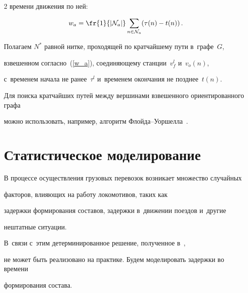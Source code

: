 \begin{multicols}{2}
времени движения по ней:


\begin{equation}


    \label{w_a}


    w_a = \fr {1}{|\mathcal N_a|}\sum\limits_{n\in \mathcal N_a} (\tau(n) - t(n))\,.


\end{equation}





Полагаем $N^*$ равной нитке, проходящей по кратчайшему пути в~графе~$G$, 


взвешенном согласно~(\ref{w_a}), соединяющему станции~$v^l_f$ и~$v_o(n)$, 


с~временем начала не ранее~$\tau^l$ и~временем окончания не позднее~$t(n)$. 


Для поиска кратчайших путей между вершинами взвешенного ориентированного графа 


можно использовать, например, алгоритм Флой\-да--Уор\-шел\-ла~\cite{Floyd}.





\vspace*{-6pt}





\section{Статистическое моделирование}





\vspace*{-2pt}





В процессе осуществления грузовых перевозок возникает множество случайных 


факторов, влияющих на работу локомотивов, таких как


задержки формирования составов, задержки в~движении поездов и~другие 


нештатные ситуации. 


В~связи с~этим детерминированное решение, полученное в~\cite{AzanovBuyanov}, 


не может быть реализовано на практике. Будем моделировать задержки во времени 


формирования состава.






\end{multicols}
